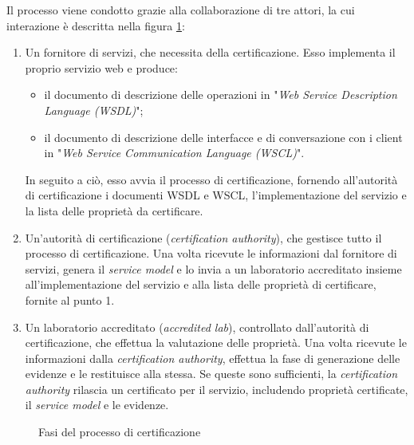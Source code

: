 \documentclass[../main.tex]{subfiles}
\begin{document}
Il processo viene condotto grazie alla collaborazione di tre attori, la cui interazione è descritta nella figura \ref{fig:CertSoaFig1b}:
\begin{enumerate}
\item Un fornitore di servizi, che necessita della certificazione. Esso implementa il proprio servizio web e produce:
\begin{itemize}
\item il documento di descrizione delle operazioni in "\textit{Web Service Description Language (WSDL)}";
\item il documento di descrizione delle interfacce e di conversazione con i client in "\textit{Web Service Communication Language (WSCL)}".
\end{itemize}
In seguito a ciò, esso avvia il processo di certificazione, fornendo all'autorità di certificazione i documenti WSDL e WSCL, l'implementazione del servizio e la lista delle proprietà da certificare. 
\item Un'autorità di certificazione (\textit{certification authority}), che gestisce tutto il processo di certificazione. Una volta ricevute le informazioni dal fornitore di servizi, genera il \textit{service model} e lo invia a un laboratorio accreditato insieme all'implementazione del servizio e alla lista delle proprietà di certificare, fornite al punto 1.
\item Un laboratorio accreditato (\textit{accredited lab}), controllato dall'autorità di certificazione, che effettua la valutazione delle proprietà. Una volta ricevute le informazioni dalla \textit{certification authority}, effettua la fase di generazione delle evidenze e le restituisce alla stessa. Se queste sono sufficienti, la \textit{certification authority} rilascia un certificato per il servizio, includendo proprietà certificate, il \textit{service model} e le evidenze.
\end{enumerate}

\begin{figure}[H]
\centering
{}
\caption{Fasi del processo di certificazione \cite{CitCertSoa}}\label{fig:CertSoaFig1b}
\end{figure}
\end{document}
